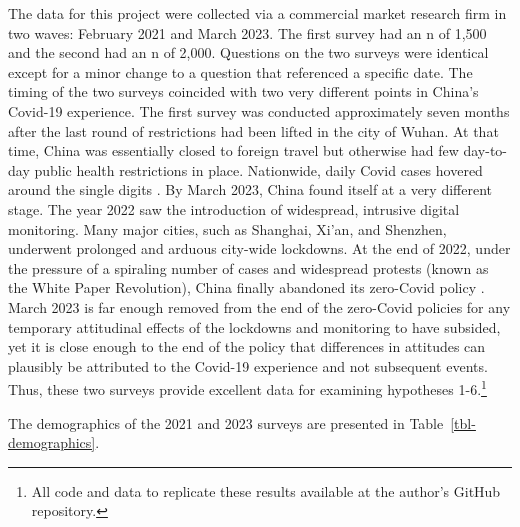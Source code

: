 \documentclass[
  number]{elsarticle}
\begin{document}
The data for this project were collected via a commercial market
research firm in two waves: February 2021 and March 2023. The first
survey had an n of 1,500 and the second had an n of 2,000. Questions on
the two surveys were identical except for a minor change to a question
that referenced a specific date. The timing of the two surveys coincided
with two very different points in China's Covid-19 experience. The first
survey was conducted approximately seven months after the last round of
restrictions had been lifted in the city of Wuhan. At that time, China
was essentially closed to foreign travel but otherwise had few
day-to-day public health restrictions in place. Nationwide, daily Covid
cases hovered around the single digits \citep{wuhanlo2021}. By March
2023, China found itself at a very different stage. The year 2022 saw
the introduction of widespread, intrusive digital monitoring. Many major
cities, such as Shanghai, Xi'an, and Shenzhen, underwent prolonged and
arduous city-wide lockdowns. At the end of 2022, under the pressure of a
spiraling number of cases and widespread protests (known as the White
Paper Revolution), China finally abandoned its zero-Covid policy
\citep{mao2022}. March 2023 is far enough removed from the end of the
zero-Covid policies for any temporary attitudinal effects of the
lockdowns and monitoring to have subsided, yet it is close enough to the
end of the policy that differences in attitudes can plausibly be
attributed to the Covid-19 experience and not subsequent events. Thus,
these two surveys provide excellent data for examining hypotheses
1-6.\footnote{All code and data to replicate these results available at
  the author's GitHub repository.}

The demographics of the 2021 and 2023 surveys are presented in
Table~\ref{tbl-demographics}.
\end{document}
